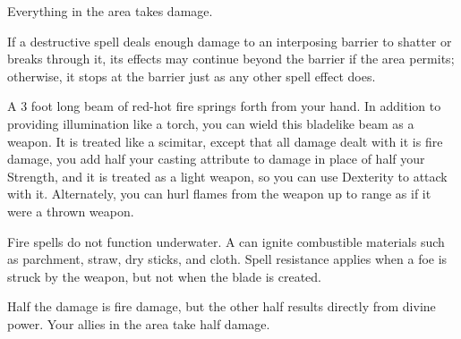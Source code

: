 \spellrng{\rngmed}
\begin{spelleffect}
  Everything in the area takes damage.
\end{spelleffect}
\begin{spellnotes}
  If a destructive spell deals enough damage to an interposing barrier to shatter or breaks through it, its effects may continue beyond the barrier if the area permits; otherwise, it stops at the barrier just as any other spell effect does.
\end{spellnotes}

\begin{spelleffect}
  A 3 foot long beam of red-hot fire springs forth from your hand. In addition to providing illumination like a torch, you can wield this bladelike beam as a weapon. It is treated like a scimitar, except that all damage dealt with it is fire damage, you add half your casting attribute to damage in place of half your Strength, and it is treated as a light weapon, so you can use Dexterity to attack with it. Alternately, you can hurl flames from the weapon up to \rngmed range as if it were a thrown weapon.
\end{spelleffect}
\begin{spellnotes}
  Fire spells do not function underwater. A  can ignite combustible materials such as parchment, straw, dry sticks, and cloth. Spell resistance applies when a foe is struck by the weapon, but not when the blade is created.
\end{spellnotes}

\spellrng{\rngclose}
\begin{spelleffect}
  Half the damage is fire damage, but the other half results directly from divine power. Your allies in the area take half damage.
\end{spelleffect}

